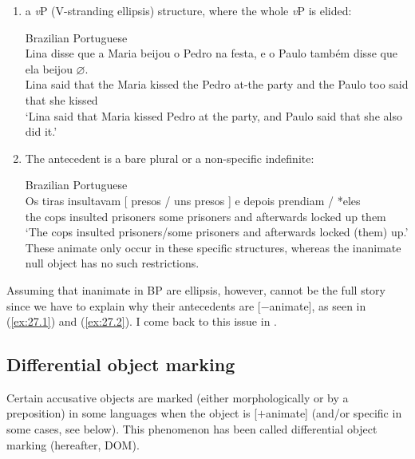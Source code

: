 \documentclass[output=paper]{langsci/langscibook}
\begin{document}
\begin{enumerate}[label=(\alph*)]
\item a \emph{v}P  (V-stranding ellipsis) structure, where the whole
\emph{v}P is elided:

\ea\label{ex:27.8} Brazilian Portuguese\\
    \gll Lina disse  que   a   Maria beijou   o Pedro na         festa, e o   Paulo também disse que ela  beijou \textbf{$\varnothing$}.\\
         Lina said    that the Maria kissed   the   Pedro   at-the   party and the Paulo too       said   that  she kissed\\
    \glt    `Lina said that Maria kissed Pedro at the party, and Paulo said that she also did it.'
\z

\item The antecedent is a bare plural or a non-specific indefinite:

\ea\label{ex:27.9} Brazilian Portuguese\\
    \gll    Os tiras  insultavam [ presos / uns presos ] e depois   prendiam \underline{\hphantom{eles}} / *eles\\
            the cops   insulted {} prisoners {} some prisoners {} and afterwards {locked up} {} {} \hphantom{*}them\\
    \glt    `The cops insulted prisoners/some prisoners and afterwards locked (them) up.'
\z
These animate  only occur in these specific structures, whereas the
inanimate null object has no such restrictions.
\end{enumerate}

Assuming that inanimate  in \gls{BP} are
ellipsis, however, cannot be the full story since we have to explain why their
antecedents are [$-$animate], as seen in
(\ref{ex:27.1}) and (\ref{ex:27.2}). I come back to this issue in
.

\subsection{Differential object marking}\label{sec:27.2.2}

Certain accusative objects are marked (either morphologically or by a
preposition) in some languages when the object is [$+$animate] (and/or specific
in some cases, see below). This phenomenon has been called differential object
marking (hereafter, DOM).
\end{document}
